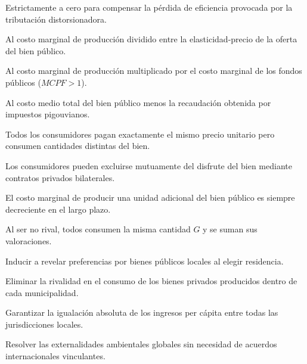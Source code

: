 \begin{opts}
    \item Estrictamente a cero para compensar la pérdida de eficiencia provocada por la tributación distorsionadora.
    \item Al costo marginal de producción dividido entre la elasticidad-precio de la oferta del bien público.
    \item Al costo marginal de producción multiplicado por el costo marginal de los fondos públicos ($MCPF > 1$).
    \item Al costo medio total del bien público menos la recaudación obtenida por impuestos pigouvianos.
\end{opts}

\begin{opts}
    \item Todos los consumidores pagan exactamente el mismo precio unitario pero consumen cantidades distintas del bien.
    \item Los consumidores pueden excluirse mutuamente del disfrute del bien mediante contratos privados bilaterales.
    \item El costo marginal de producir una unidad adicional del bien público es siempre decreciente en el largo plazo.
    \item Al ser no rival, todos consumen la misma cantidad $G$ y se suman sus valoraciones.
\end{opts}

\begin{opts}
    \item Inducir a revelar preferencias por bienes públicos locales al elegir residencia.
    \item Eliminar la rivalidad en el consumo de los bienes privados producidos dentro de cada municipalidad.
    \item Garantizar la igualación absoluta de los ingresos per cápita entre todas las jurisdicciones locales.
    \item Resolver las externalidades ambientales globales sin necesidad de acuerdos internacionales vinculantes.
\end{opts}

